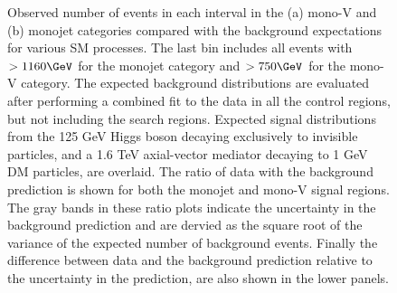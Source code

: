 \begin{figure}[hbt]
\begin{center}
\caption{
      Observed number of events in each \ETmiss interval in the (a) mono-V and (b) monojet categories compared with the background expectations for various SM processes.
      The last bin includes all events with \ETmiss$ > 1160 \GeV$ for the monojet category and \ETm$ > 750 \GeV$ for the mono-V category.
      The expected background distributions are evaluated after performing a combined fit to the data in all the control regions, but not including the search regions.
      Expected signal distributions from the 125 GeV Higgs boson decaying exclusively to invisible particles, and a 1.6 TeV axial-vector mediator decaying to 1 GeV DM particles, are overlaid.
      The ratio of data with the background prediction is shown for both the monojet and mono-V signal regions.
      The gray bands in these ratio plots indicate the uncertainty in the background prediction and are dervied as the square root of the variance of the expected number of background events.
      Finally the difference between data and the background prediction relative to the uncertainty in the prediction,
      are also shown in the lower panels.
   }
   \label{fig:monojetv} 
  \end{center}
\end{figure}


